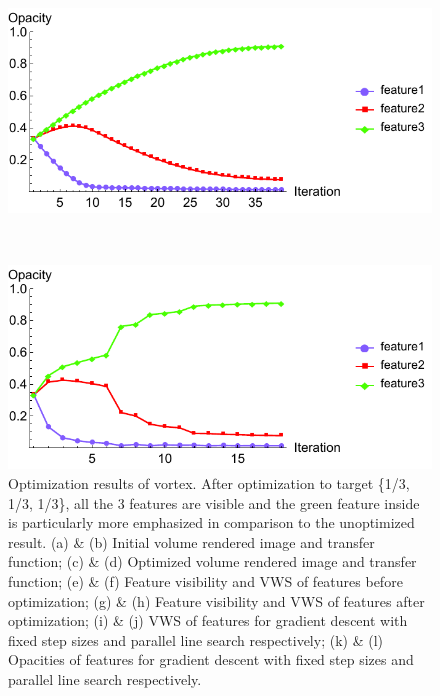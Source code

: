 \begin{figure}
	\begin{minipage}{.49\textwidth}
		\includegraphics[width=1\linewidth]{figures/vortex_naive_proportional_opacity_fixed}
		\subcaption{}
	\end{minipage}~
	\begin{minipage}{.49\textwidth}
		\includegraphics[width=1\linewidth]{figures/vortex_naive_proportional_opacity_parallelsearch}
		\subcaption{}
	\end{minipage}
	\caption[Optimization results of vortex]{Optimization results of vortex. After optimization to target \{1/3, 1/3, 1/3\}, all the 3 features are visible and the green feature inside is particularly more emphasized in comparison to the unoptimized result.
	(a) \& (b) Initial volume rendered image and transfer function; (c) \& (d) Optimized volume rendered image and transfer function; (e) \& (f) Feature visibility and VWS of features before optimization; (g) \& (h) Feature visibility and VWS of features after optimization; (i) \& (j) VWS of features for gradient descent with fixed step sizes and parallel line search respectively; (k) \& (l) Opacities of features for gradient descent with fixed step sizes and parallel line search respectively.}
	\label{fig:vortex_naive_optimized}
\end{figure}

